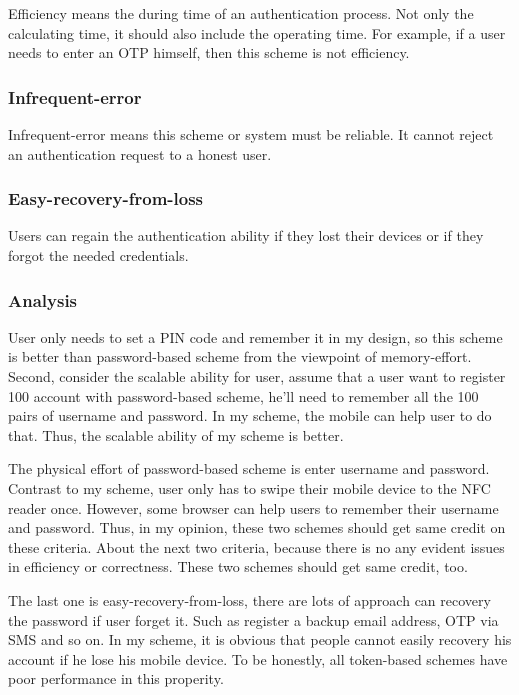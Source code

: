 \begin{CJK}{Bg5}{bsmi}
Efficiency means the during time of an authentication process. Not only the calculating time, it should also include the operating time. For example, if a user needs to enter an OTP himself, then this scheme is not efficiency.

\subsubsection{Infrequent-error}

Infrequent-error means this scheme or system must be reliable. It cannot reject an authentication request to a honest user.

\subsubsection{Easy-recovery-from-loss}

Users can regain the authentication ability if they lost their devices or if they forgot the needed credentials.

\subsubsection{Analysis}

User only needs to set a PIN code and remember it in my design, so this scheme is better than password-based scheme from the viewpoint of memory-effort. Second, consider the scalable ability for user, assume that a user want to register 100 account with password-based scheme, he'll need to remember all the 100 pairs of username and password. In my scheme, the mobile can help user to do that. Thus, the scalable ability of my scheme is better.

The physical effort of password-based scheme is enter username and password. Contrast to my scheme, user only has to swipe their mobile device to the NFC reader once. However, some browser can help users to remember their username and password. Thus, in my opinion, these two schemes should get same credit on these criteria. About the next two criteria, because there is no any evident issues in efficiency or correctness. These two schemes should get same credit, too.

The last one is easy-recovery-from-loss, there are lots of approach can recovery the password if user forget it. Such as register a backup email address, OTP via SMS and so on. In my scheme, it is obvious that people cannot easily recovery his account if he lose his mobile device. To be honestly, all token-based schemes have poor performance in this properity.


\end{CJK}
